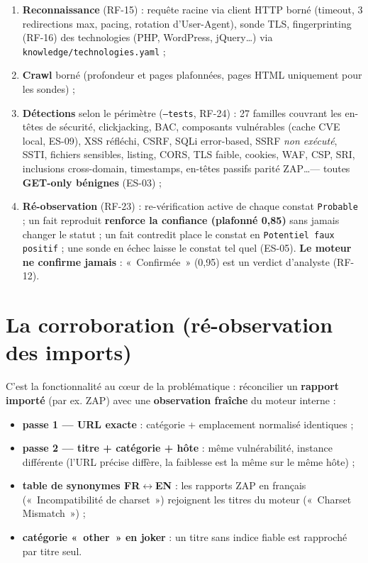 \documentclass[11pt,a4paper]{report}
\newcommand{\code}[1]{\texttt{#1}}
\begin{document}
\begin{enumerate}[leftmargin=1.8em]
  \item \textbf{Reconnaissance} (RF-15) : requête racine via client HTTP borné (timeout, 3
        redirections max, pacing, rotation d'User-Agent), sonde TLS, fingerprinting
        (RF-16) des technologies (PHP, WordPress, jQuery\ldots) via
        \code{knowledge/technologies.yaml} ;
  \item \textbf{Crawl} borné (profondeur et pages plafonnées, pages HTML uniquement pour
        les sondes) ;
  \item \textbf{Détections} selon le périmètre (\code{--tests}, RF-24) : 27 familles
        couvrant les en-têtes de sécurité, clickjacking, BAC, composants vulnérables
        (cache CVE local, ES-09), XSS réfléchi, CSRF, SQLi error-based, SSRF \emph{non
        exécuté}, SSTI, fichiers sensibles, listing, CORS, TLS faible, cookies, WAF, CSP,
        SRI, inclusions cross-domain, timestamps, en-têtes passifs parité ZAP\ldots ---
        toutes \textbf{GET-only bénignes} (ES-03) ;
  \item \textbf{Ré-observation} (RF-23) : re-vérification active de chaque constat
        \code{Probable} ; un fait reproduit \textbf{renforce la confiance (plafonné
        0,85)} sans jamais changer le statut ; un fait contredit place le constat en
        \code{Potentiel faux positif} ; une sonde en échec laisse le constat tel quel
        (ES-05). \textbf{Le moteur ne confirme jamais} : «~Confirmée~» (0,95) est un
        verdict d'analyste (RF-12).
\end{enumerate}

\section{La corroboration (ré-observation des imports)}

C'est la fonctionnalité au cœur de la problématique : réconcilier un \textbf{rapport
importé} (par ex. ZAP) avec une \textbf{observation fraîche} du moteur interne :

\begin{itemize}[leftmargin=1.5em]
  \item \textbf{passe 1 --- URL exacte} : catégorie + emplacement normalisé identiques ;
  \item \textbf{passe 2 --- titre + catégorie + hôte} : même vulnérabilité, instance
        différente (l'URL précise diffère, la faiblesse est la même sur le même hôte) ;
  \item \textbf{table de synonymes FR$\leftrightarrow$EN} : les rapports ZAP en français
        («~Incompatibilité de charset~») rejoignent les titres du moteur («~Charset
        Mismatch~») ;
  \item \textbf{catégorie «~other~» en joker} : un titre sans indice fiable est rapproché
        par titre seul.
\end{itemize}
\end{document}
